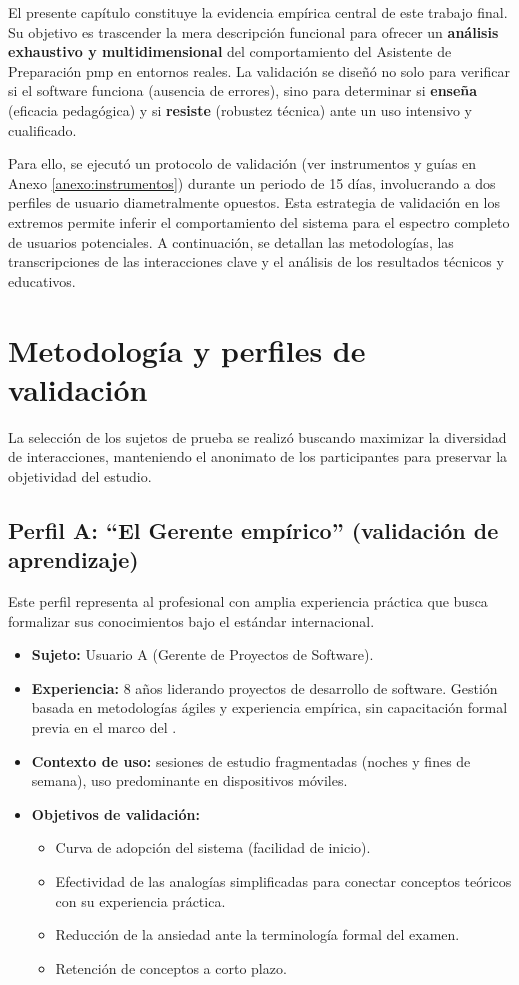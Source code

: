 El presente capítulo constituye la evidencia empírica central de este trabajo final. Su objetivo es trascender la mera descripción funcional para ofrecer un \textbf{análisis exhaustivo y multidimensional} del comportamiento del Asistente de Preparación \gls{pmp} en entornos reales. La validación se diseñó no solo para verificar si el software funciona (ausencia de errores), sino para determinar si \textbf{enseña} (eficacia pedagógica) y si \textbf{resiste} (robustez técnica) ante un uso intensivo y cualificado.

Para ello, se ejecutó un protocolo de validación (ver instrumentos y guías en Anexo \ref{anexo:instrumentos}) durante un periodo de 15 días, involucrando a dos perfiles de usuario diametralmente opuestos. Esta estrategia de validación en los extremos permite inferir el comportamiento del sistema para el espectro completo de usuarios potenciales. A continuación, se detallan las metodologías, las transcripciones de las interacciones clave y el análisis de los resultados técnicos y educativos.

\section{Metodología y perfiles de validación}

La selección de los sujetos de prueba se realizó buscando maximizar la diversidad de interacciones, manteniendo el anonimato de los participantes para preservar la objetividad del estudio.

\subsection{Perfil A: \enquote{El Gerente empírico} (validación de aprendizaje)}
Este perfil representa al profesional con amplia experiencia práctica que busca formalizar sus conocimientos bajo el estándar internacional.
\begin{itemize}
\item   \textbf{Sujeto:} Usuario A (Gerente de Proyectos de Software).
\item   \textbf{Experiencia:} 8 años liderando proyectos de desarrollo de software. Gestión basada en metodologías ágiles y experiencia empírica, sin capacitación formal previa en el marco del .
\item   \textbf{Contexto de uso:} sesiones de estudio fragmentadas (noches y fines de semana), uso predominante en dispositivos móviles.
\item   \textbf{Objetivos de validación:}
\begin{itemize}
\item   Curva de adopción del sistema (facilidad de inicio).
\item   Efectividad de las analogías simplificadas para conectar conceptos teóricos con su experiencia práctica.
\item   Reducción de la ansiedad ante la terminología formal del examen.
\item   Retención de conceptos a corto plazo.
\end{itemize}
\end{itemize}

